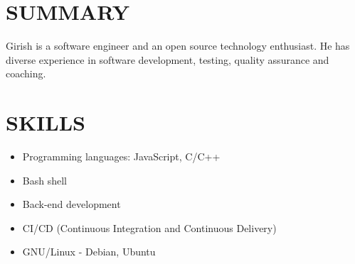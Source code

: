 \documentclass[line, margin]{res}
\begin{document}
\address{\href{mailto:girishm@posteo.net}{girishm@posteo.net} \hspace{10cm} \url{https://girishm.info}}

\begin{resume}
  \section{SUMMARY}
  Girish is a software engineer and an open source technology
  enthusiast. He has diverse experience in software development,
  testing, quality assurance and coaching.
  \section{SKILLS}
    \begin{itemize}
    \item Programming languages: JavaScript, C/C++
    \item Bash shell
    \item Back-end development
    \item CI/CD (Continuous Integration and Continuous Delivery)
    \item GNU/Linux - Debian, Ubuntu
    \end{itemize}

\end{resume}
\end{document}
